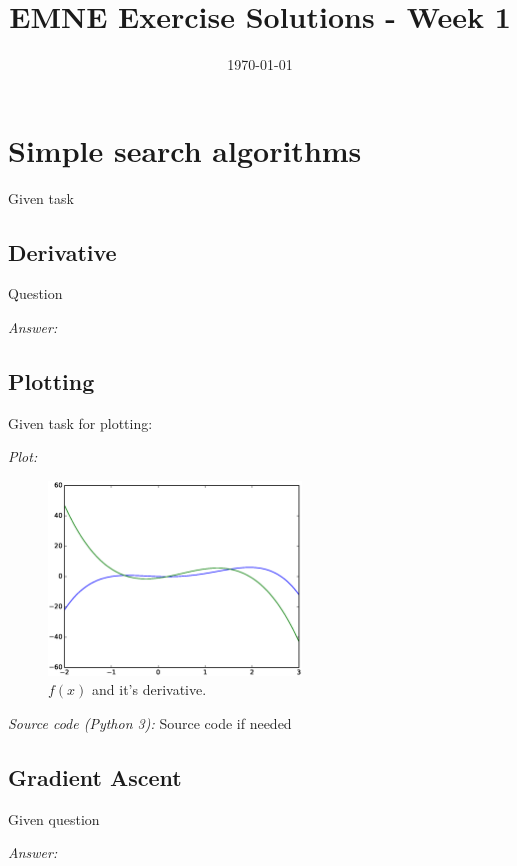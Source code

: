 \documentclass{article}           %
\title{\vspace{-2cm}EMNE Exercise Solutions - Week 1}
\date{\today}
\newcommand\marginsymbol[1][0pt]{%
  \tabto*{0cm}\makebox[\dimexpr-1cm-#1\relax][r]{$\mathbb{P}$}\tabto*{\TabPrevPos}}
\begin{document}
    \renewcommand\marginsymbol[1][0pt]{%
  \tabto*{0cm}\makebox[-1cm][c]{$\mathbb{P}$}\tabto*{\TabPrevPos}}

\maketitle


\section{Simple search algorithms}

Given task

\subsection{Derivative}
Question 

\textit{Answer:}

\subsection{Plotting \marginsymbol}
Given task for plotting:

\emph{Plot:}
\begin{figure}[H]
\begin{center}
\includegraphics[width=0.6\textwidth]{eps/w1e1b.eps}
\caption{\(f(x)\) and it's derivative.}
\label{fig:w1e1b}
\end{center}
\end{figure}

\emph{Source code (Python 3):}
Source code if needed

\subsection{Gradient Ascent \marginsymbol}
\label{subsec:grada}
Given question

\textit{Answer:}
\end{document}
